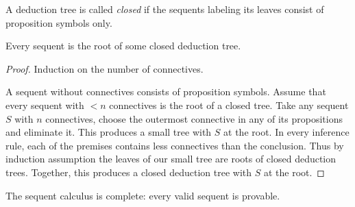 \begin{page}
\setcounter{section}{2}
\setcounter{subsection}{7}
\setcounter{dfn}{17}
\label{portion:538}

\begin{dfn}
A deduction tree is called \emph{closed} if the sequents labeling its leaves consist of proposition symbols only.
\end{dfn}

\end{page}

\begin{page}
\setcounter{section}{2}
\setcounter{subsection}{7}
\setcounter{dfn}{18}
\label{portion:541}

\begin{lem}
Every sequent is the root of some closed deduction tree.
\end{lem}

\end{page}

\begin{page}
\setcounter{section}{2}
\setcounter{subsection}{7}
\setcounter{dfn}{18}
\label{portion:542}

\begin{proof}
Induction on the number of connectives.

A sequent without connectives consists of proposition symbols.
Assume that every sequent with $< n$ connectives is the root of a closed tree.
Take any sequent $S$ with $n$ connectives, choose the outermost connective in any of its propositions and eliminate it.
This produces a small tree with $S$ at the root.
In every inference rule, each of the premises contains less connectives than the conclusion.
Thus by induction assumption the leaves of our small tree are roots of closed deduction trees.
Together, this produces a closed deduction tree with $S$ at the root.
\end{proof}


\end{page}

\begin{page}
\setcounter{section}{2}
\setcounter{subsection}{7}
\setcounter{dfn}{19}
\label{portion:544}

\begin{thm}
The sequent calculus is complete: every valid sequent is provable.
\end{thm}

\end{page}

